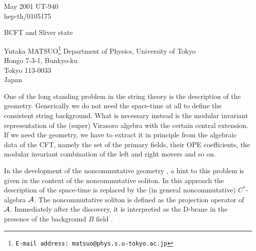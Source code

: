 \documentclass[a4paper,12pt]{article}
\begin{document}
\begin{titlepage}
\nopagebreak
%
%
\begin{flushright}
May 2001\hfill
UT-940\\
hep-th/0105175
\end{flushright}

\renewcommand{\thefootnote}{\fnsymbol{footnote}}
\vfill
\begin{center}
{\Large BCFT and Sliver state}%

\vskip 20mm

Yutaka MATSUO\footnote{
{\tt E-mail address: matsuo@phys.s.u-tokyo.ac.jp}
}
\vskip 1cm
Department of Physics, University of Tokyo\\
Hongo 7-3-1, Bunkyo-ku\\
Tokyo 113-0033\\
Japan
\end{center}
\vfill

\begin{abstract}
We give a comment on the possible r\^ole of
the sliver state in the generic boundary conformal
field theory. We argue that for each Cardy state,
there exists at least one projector in the string field theory.
\end{abstract}

\vfill
\end{titlepage}

One of the long standing problem in the string theory is the
description of the geometry.  Generically we do not need
the space-time at all to define
the consistent string background.  What is necessary instead is
the modular invariant representation of the (super) Virasoro
algebra with the certain central extension.
If we need the geometry, we have to extract it in principle from the
algebraic data of the CFT, namely the set of the primary fields,
their OPE coefficients, the modular invariant combination of
the left and right movers and so on.

In the development of the noncommutative geometry
\cite{r-CDS, r-SW}, a hint
to this problem is given in the context of the noncommutative
soliton\cite{r-GMS}.  In this approach the description of the space-time
is replaced by the (in general noncommutative) $C^*$-algebra $\cal A$.
The noncommutative soliton is defined as the projection operator
of $\cal A$.  Immediately after the discovery, it is 
interpreted as the D-brane in the presence of the background $B$
field \cite{r-HKLM}.
\end{document}

